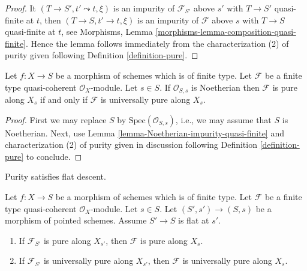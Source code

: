 \begin{proof}
It $(T \to S', t' \leadsto t, \xi)$ is an impurity of
$\mathcal{F}_{S'}$ above $s'$ with $T \to S'$ quasi-finite at $t$,
then $(T \to S, t' \to t, \xi)$ is an impurity of $\mathcal{F}$
above $s$ with $T \to S$ quasi-finite at $t$, see
Morphisms, Lemma \ref{morphisms-lemma-composition-quasi-finite}.
Hence the lemma follows immediately from the characterization (2)
of purity given following
Definition \ref{definition-pure}.
\end{proof}

\begin{lemma}
\label{lemma-Noetherian-base-change}
Let $f : X \to S$ be a morphism of schemes which is of finite type.
Let $\mathcal{F}$ be a finite type quasi-coherent $\mathcal{O}_X$-module.
Let $s \in S$. If $\mathcal{O}_{S, s}$ is Noetherian then
$\mathcal{F}$ is pure along $X_s$ if and only if $\mathcal{F}$
is universally pure along $X_s$.
\end{lemma}

\begin{proof}
First we may replace $S$ by $\text{Spec}(\mathcal{O}_{S, s})$, i.e.,
we may assume that $S$ is Noetherian. Next, use
Lemma \ref{lemma-Noetherian-impurity-quasi-finite}
and characterization (2) of purity given in discussion following
Definition \ref{definition-pure}
to conclude.
\end{proof}

\noindent
Purity satisfies flat descent.

\begin{lemma}
\label{lemma-flat-descend-pure}
Let $f : X \to S$ be a morphism of schemes which is of finite type.
Let $\mathcal{F}$ be a finite type quasi-coherent $\mathcal{O}_X$-module.
Let $s \in S$. Let $(S', s') \to (S, s)$ be a morphism of pointed schemes.
Assume $S' \to S$ is flat at $s'$.
\begin{enumerate}
\item If $\mathcal{F}_{S'}$ is pure along $X_{s'}$,
then $\mathcal{F}$ is pure along $X_s$.
\item If $\mathcal{F}_{S'}$ is universally pure along $X_{s'}$,
then $\mathcal{F}$ is universally pure along $X_s$.
\end{enumerate}
\end{lemma}

